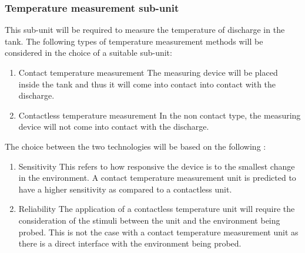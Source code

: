\subsubsection{Temperature measurement sub-unit}
This sub-unit will be required to measure the temperature of discharge in the tank. The following types of temperature measurement methods will be considered in the choice of a suitable sub-unit:
\begin{enumerate}
    \item Contact temperature measurement \newline
    The measuring device will be placed inside the tank and thus it will come into contact into contact with the discharge.
    \item Contactless temperature measurement \newline
    In the non contact type, the measuring device  will not come into contact with the discharge.
\end{enumerate}
\par
The choice between the two technologies will be based on the following :
\begin{enumerate}
    \item Sensitivity \newline 
     This refers to how responsive the device is to the smallest change in the environment. A contact temperature measurement unit is predicted to have a higher sensitivity as compared to a contactless unit.
     \item Reliability \newline
     The application of a contactless temperature unit will require the consideration of the stimuli between the unit and the environment being probed. This is not the case with a contact temperature measurement unit as there is a direct interface with the environment being probed.
\end{enumerate}

